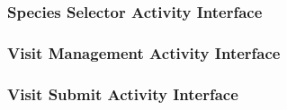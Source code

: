 	\newpage
	\subsubsection{Species Selector Activity Interface}
		

	\newpage
	\subsubsection{Visit Management Activity Interface}
		

	\newpage
	\subsubsection{Visit Submit Activity Interface}
		
